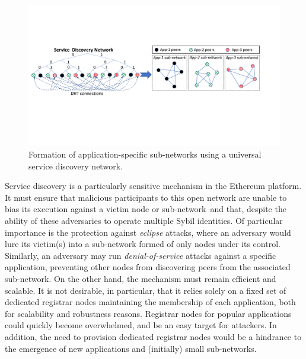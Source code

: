 \begin{figure}[b!]
    \includegraphics[width=1\linewidth]{img/subnetwork}
    \caption{Formation of application-specific sub-networks using a universal service discovery network.
    }
    \label{fig:subnetwork}
\end{figure}

Service discovery is a particularly sensitive mechanism in the Ethereum platform.
It must ensure that malicious participants to this open network are unable to bias its execution against a victim node or sub-network--and that, despite the ability of these adversaries to operate multiple Sybil identities.
Of particular importance is the protection against \emph{eclipse} attacks, where an adversary would lure its victim(s) into a sub-network formed of only nodes under its control.
Similarly, an adversary may run \emph{denial-of-service} attacks against a specific application, preventing other nodes from discovering peers from the associated sub-network.
On the other hand, the mechanism must remain efficient and scalable.
It is not desirable, in particular, that it relies solely on a fixed set of dedicated registrar nodes maintaining the membership of each application, both for scalability and robustness reasons. Registrar nodes for popular applications could quickly become overwhelmed, and be an easy target for attackers.
In addition, the need to provision dedicated registrar nodes would be a hindrance to the emergence of new applications and (initially) small sub-networks.


